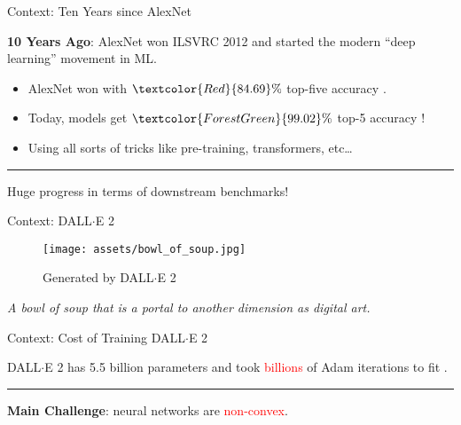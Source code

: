 \documentclass[usenames,dvipsnames,mathserif,notheorems]{beamer}
\newcommand{\horizontalrule}{
	{
			\vspace{-0.5em}
			\center \rule{\textwidth}{0.1em}
			\vspace{-0.2em}
		}
}
\newcommand{\red}[1]{\textcolor{Red}{#1}}
\newcommand{\green}[1]{\textcolor{ForestGreen}{#1}}
\begin{document}
\begin{frame}{Context: Ten Years since AlexNet}

	{
		\large \textbf{10 Years Ago}: AlexNet won ILSVRC 2012 and started the modern ``deep learning'' movement in ML.
	}

	\pause
	\vspace{1ex}

	\begin{itemize}
		\large
		\item AlexNet won with \( \red{84.69}\% \) top-five accuracy \citep{krizhevsky2012alexnet}.
		      \vspace{1ex}

		\item Today, models get \( \green{99.02}\% \) top-5 accuracy \citep{yuan2021florence}!
		      \vspace{1ex}

		      \pause
		\item Using all sorts of tricks like pre-training, transformers, etc\ldots
	\end{itemize}

	\pause
	\horizontalrule

	\begin{center}
		\Large
		Huge progress in terms of downstream benchmarks!
	\end{center}

\end{frame}


\begin{frame}{Context: DALL$\cdot$E 2}

	\begin{figure}[]
		\centering
		\texttt{[image: assets/bowl\_of\_soup.jpg]}
		\caption*{Generated by DALL$\cdot$E 2}%
	\end{figure}

	\begin{center}
		\textit{\Large A bowl of soup that is a portal to another
			dimension as digital art.}
	\end{center}


\end{frame}

\begin{frame}{Context: Cost of Training DALL$\cdot$E 2}

	\begin{center}
		\Large
		DALL$\cdot$E 2 has 5.5 billion parameters and took \red{billions} of Adam
		iterations to fit \citep{ramesh2022dalle}.
	\end{center}

	\pause
	\horizontalrule

	\begin{center}
		\Large
		\textbf{Main Challenge}: neural networks are \textcolor{red}{non-convex}.
	\end{center}


	\begin{figure}[]
		\centering
		
	\end{figure}

\end{frame}
\end{document}
